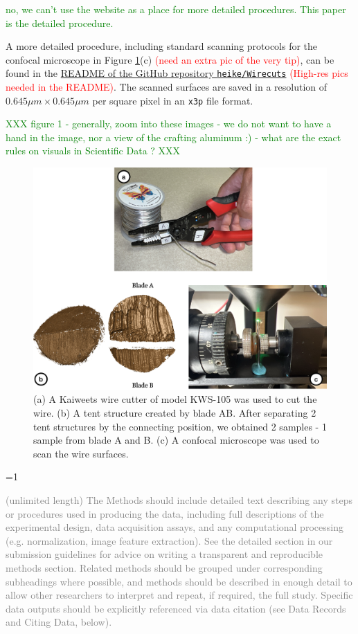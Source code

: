 \documentclass[fleqn,10pt]{wlscirep}
\newcommand{\hh}[1]{{\textcolor{Green}{#1}}}
\newcommand{\ifinstruction}{1} %
\begin{document}
\hh{no, we can't use the website as a place for more detailed procedures. This paper is the detailed procedure.}

A more detailed procedure, including standard scanning protocols for the
confocal microscope in Figure \ref{fig: cut-tent-scan}(c)
\textcolor{red}{(need an extra pic of the very tip)}, can be found in
the
\href{https://github.com/heike/Wirecuts/blob/main/README.md}{README of the GitHub repository \texttt{heike/Wirecuts}}
\textcolor{red}{(High-res pics needed in the README)}. The scanned
surfaces are saved in a resolution of \(0.645 \mu m \times 0.645 \mu m\)
per square pixel in an \texttt{x3p} file format.

\hh{XXX figure 1 - generally, zoom into these images - we do not want to have a hand in the image, nor a view of the crafting aluminum :)  - what are the exact rules on visuals in Scientific Data ? XXX}

\begin{figure}[ht]
\centering
\includegraphics[width=0.9\linewidth]{cut-tent-scan.png}
\caption{(a) A Kaiweets wire cutter of model KWS-105 was used to cut the wire. (b) A tent structure created by blade AB. After separating 2 tent structures by the connecting position, we obtained 2 samples - 1 sample from blade A and B. (c) A confocal microscope was used to scan the wire surfaces.}
\label{fig: cut-tent-scan}
\end{figure}

\ifnum \ifinstruction=1

\textcolor{gray}{(unlimited length) The Methods should include detailed text describing any steps or procedures used in producing the data, including full descriptions of the experimental design, data acquisition assays, and any computational processing (e.g. normalization, image feature extraction). See the detailed section in our submission guidelines for advice on writing a transparent and reproducible methods section. Related methods should be grouped under corresponding subheadings where possible, and methods should be described in enough detail to allow other researchers to interpret and repeat, if required, the full study. Specific data outputs should be explicitly referenced via data citation (see Data Records and Citing Data, below).}
\end{document}
